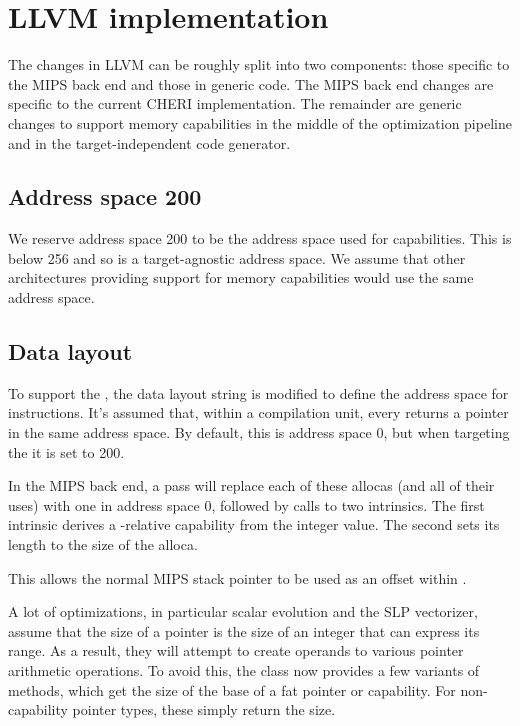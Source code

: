 \chapter{LLVM implementation}

The changes in LLVM can be roughly split into two components: those specific to the MIPS back end and those in generic code.
The MIPS back end changes are specific to the current CHERI implementation.
The remainder are generic changes to support memory capabilities in the middle of the optimization pipeline and in the target-independent code generator.

\section{Address space 200}

We reserve address space 200 to be the address space used for capabilities.
This is below 256 and so is a target-agnostic address space.
We assume that other architectures providing support for memory capabilities would use the same address space.

\section{Data layout}
\label{sec:datalayout}

To support the \sandboxABI{}, the data layout string is modified to define the address space for  instructions.
It's assumed that, within a compilation unit, every  returns a pointer in the same address space.
By default, this is address space 0, but when targeting the \sandboxABI{} it is set to 200.

In the MIPS back end, a pass will replace each of these allocas (and all of their uses) with one in address space 0, followed by calls to two intrinsics.
The first intrinsic derives a -relative capability from the integer value.
The second sets its length to the size of the alloca.

This allows the normal MIPS stack pointer to be used as an offset within .

A lot of optimizations, in particular scalar evolution and the SLP vectorizer, assume that the size of a pointer is the size of an integer that can express its range.
As a result, they will attempt to create  operands to various pointer arithmetic operations.
To avoid this, the  class now provides a few variants of  methods, which get the size of the base of a fat pointer or capability.
For non-capability pointer types, these simply return the size.

